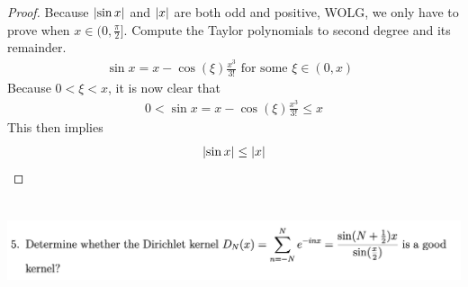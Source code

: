 \documentclass{report}
\begin{document}
\begin{proof}
Because $\left|\sin x\right|$ and $\left|x\right|$ are both odd and positive, WOLG, we only have to prove when $x\in (0,\frac{\pi}{2}]$. Compute the Taylor polynomials to second degree and its remainder. 
\begin{align*}
\sin x= x- \cos (\xi)\frac{x^3}{3!}\text{ for some $\xi\in (0,x)$  }
\end{align*}
Because $0<\xi <x$, it is now clear that 
\begin{align*}
0< \sin x =x- \cos(\xi) \frac{x^3}{3!}\leq x
\end{align*}
This then implies 
\begin{align*}
\left|\sin x\right|\leq \left|x\right|
\end{align*}
\end{proof}
\begin{question}{}{}
\includegraphics[height=3cm,width=18cm]{hw3q5}
\end{question}
\end{document}

